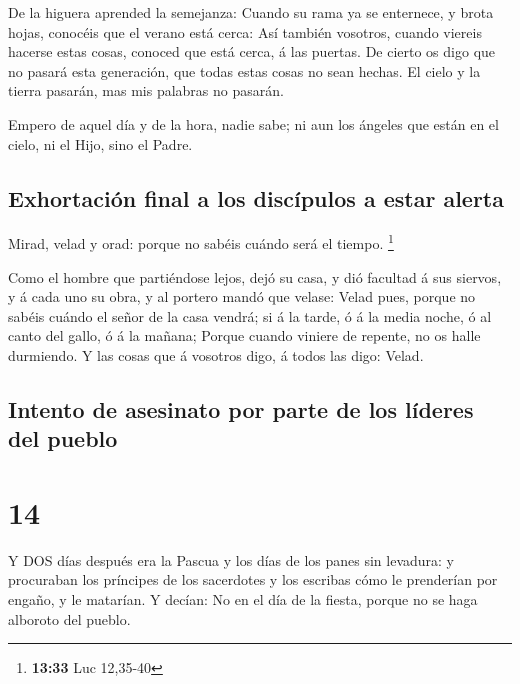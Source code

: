  De la higuera aprended la semejanza: Cuando su rama ya se
enternece, y brota hojas, conocéis que el verano está cerca:
 Así también vosotros, cuando viereis hacerse estas cosas,
conoced que está cerca, á las puertas.  De cierto os digo
que no pasará esta generación, que todas estas cosas no sean hechas.
 El cielo y la tierra pasarán, mas mis palabras no pasarán.

 Empero de aquel día y de la hora, nadie sabe; ni aun los
ángeles que están en el cielo, ni el Hijo, sino el Padre.

\hypertarget{exhortaciuxf3n-final-a-los-discuxedpulos-a-estar-alerta}{%
\subsection{Exhortación final a los discípulos a estar
alerta}\label{exhortaciuxf3n-final-a-los-discuxedpulos-a-estar-alerta}}

 Mirad, velad y orad: porque no sabéis cuándo será el
tiempo. \footnote{\textbf{13:33} Luc 12,35-40}

 Como el hombre que partiéndose lejos, dejó su casa, y dió
facultad á sus siervos, y á cada uno su obra, y al portero mandó que
velase:  Velad pues, porque no sabéis cuándo el señor de la
casa vendrá; si á la tarde, ó á la media noche, ó al canto del gallo, ó
á la mañana;  Porque cuando viniere de repente, no os halle
durmiendo.  Y las cosas que á vosotros digo, á todos las
digo: Velad.

\hypertarget{intento-de-asesinato-por-parte-de-los-luxedderes-del-pueblo}{%
\subsection{Intento de asesinato por parte de los líderes del
pueblo}\label{intento-de-asesinato-por-parte-de-los-luxedderes-del-pueblo}}

\hypertarget{section-13}{%
\section{14}\label{section-13}}

 Y DOS días después era la Pascua y los días de los panes
sin levadura: y procuraban los príncipes de los sacerdotes y los
escribas cómo le prenderían por engaño, y le matarían.  Y
decían: No en el día de la fiesta, porque no se haga alboroto del
pueblo.

